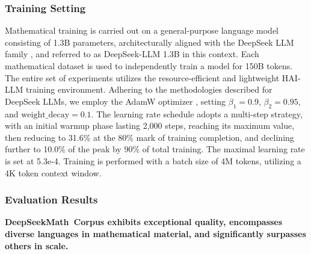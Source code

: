 \subsubsection{Training Setting}
\label{sec:quality-policy}
Mathematical training is carried out on a general-purpose language model consisting of 1.3B parameters, architecturally aligned with the DeepSeek LLM family \citep{deepseek-llm}, and referred to as DeepSeek-LLM 1.3B in this context. Each mathematical dataset is used to independently train a model for 150B tokens. The entire set of experiments utilizes the resource-efficient and lightweight HAI-LLM \citep{haillm} training environment. Adhering to the methodologies described for DeepSeek LLMs, we employ the AdamW optimizer \citep{adamW}, setting $\beta_1=0.9$, $\beta_2=0.95$, and $\mathrm{weight\_decay}=0.1$. The learning rate schedule adopts a multi-step strategy, with an initial warmup phase lasting 2,000 steps, reaching its maximum value, then reducing to 31.6\% at the 80\% mark of training completion, and declining further to 10.0\% of the peak by 90\% of total training. The maximal learning rate is set at 5.3e-4. Training is performed with a batch size of 4M tokens, utilizing a 4K token context window.

\subsubsection{Evaluation Results}

\textbf{DeepSeekMath~Corpus exhibits exceptional quality, encompasses diverse languages in mathematical material, and significantly surpasses others in scale.}

